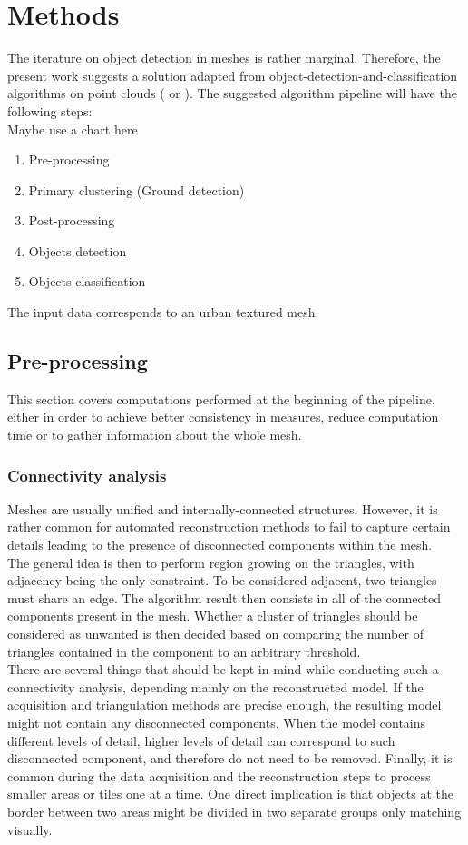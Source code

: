 \documentclass{kththesis}
\begin{document}
\chapter{Methods}
The iterature on object detection in meshes is rather marginal. Therefore, the present work suggests a solution adapted from object-detection-and-classification algorithms on point clouds (\textcite{HernandezArtefacts, det_seg_class} or \textcite{Finnish3Dpc}). 
The suggested algorithm pipeline will have the following steps: \\
Maybe use a chart here
\begin{center}
\begin{enumerate}[topsep=2ex,itemsep=-1ex,partopsep=1ex,parsep=1ex]
    \item Pre-processing
    \item Primary clustering (Ground detection)
    \item Post-processing
    \item Objects detection
    \item Objects classification
\end{enumerate}
\end{center}

The input data corresponds to an urban textured mesh. 
\section{Pre-processing}
This section covers computations performed at the beginning of the pipeline, either in order to achieve better consistency in measures, reduce computation time or to gather information about the whole mesh. 
\subsection{Connectivity analysis}
Meshes are usually unified and internally-connected structures. However, it is rather common for automated reconstruction methods to fail to capture certain details leading to the presence of disconnected components within the mesh. \\ 
The general idea is then to perform region growing on the triangles, with adjacency being the only constraint. To be considered adjacent, two triangles must share an edge. The algorithm result then consists in all of the connected components present in the mesh. Whether a cluster of triangles should be considered as unwanted is then decided based on comparing the number of triangles contained in the component to an arbitrary threshold. \\
There are several things that should be kept in mind while conducting such a connectivity analysis, depending mainly on the reconstructed model. If the acquisition and triangulation methods are precise enough, the resulting model might not contain any disconnected components. When the model contains different levels of detail, higher levels of detail can correspond to such disconnected component, and therefore do not need to be removed. Finally, it is common during the data acquisition and the reconstruction steps to process smaller areas or tiles one at a time. One direct implication is that objects at the border between two areas might be divided in two separate groups only matching visually. 
\end{document}
